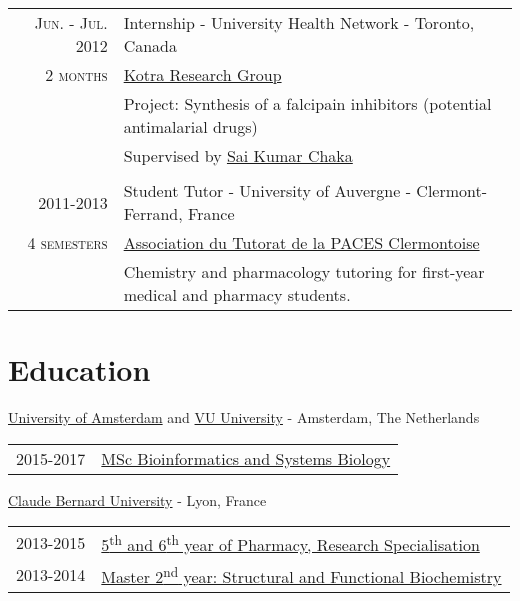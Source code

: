 \documentclass[a4paper, 10pt]{article} %
\begin{document}
\begin{tabular}{r|p{12.5cm}}

\textsc{Jun. - Jul. 2012} & Internship - University Health Network - Toronto, Canada \\
\textsc{2 months} & \href{http://kotralab.uhnresearch.ca/}{Kotra Research Group} \\
& \footnotesize{Project: Synthesis of a falcipain inhibitors (potential antimalarial drugs)} \\
& \footnotesize{Supervised by \href{http://www.linkedin.com/in/sai-kumar-chakka-178aa215}{Sai Kumar Chaka}} \\
\multicolumn{2}{c}{} \\


\textsc{2011-2013} & Student Tutor - University of Auvergne - Clermont-Ferrand, France \\
\textsc{4 semesters} & \href{https://www.atpclermont.fr/}{Association du Tutorat de la PACES Clermontoise}\\
& \footnotesize{Chemistry and pharmacology tutoring for first-year medical and pharmacy students}. \\

\end{tabular}


\section{Education}

\href{http://www.uva.nl/en/home}{University of Amsterdam} and \href{http://www.vu.nl/en/index.aspx}{VU University} - Amsterdam, The Netherlands

\begin{tabular}{ll}
\textsc{2015-2017} & \href{http://gss.uva.nl/future-msc-students/life-and-earth-sciences/content33/systems-biology.html}{MSc Bioinformatics and Systems Biology}
\end{tabular}

\href{http://www.univ-lyon1.fr/en/home-759942.kjsp?RH=WWW-FR}{Claude Bernard University} - Lyon, France

\begin{tabular}{ll}
\textsc{2013-2015} & \href{http://ispb.univ-lyon1.fr/}{5\textsuperscript{th} and 6\textsuperscript{th} year of Pharmacy, Research Specialisation} \\
\textsc{2013-2014} & \href{http://spiralconnect.univ-lyon1.fr/webapp/website/website.html?id=2218791&read=true}{Master 2\textsuperscript{nd} year: Structural and Functional Biochemistry}
\end{tabular}
\end{document}
